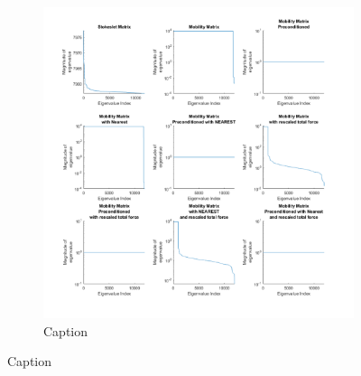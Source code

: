  \begin{figure}
     \centering
     \begin{subfigure}[b]{0.49\textwidth}
        \captionsetup{width=0.49\textwidth}
        \includegraphics[height=0.49\textheight,keepaspectratio]{Images/Eigenplots/EigenPlots-1.pdf}
        \caption{Caption}
        \label{fig:Eigen1}
    \end{subfigure}
\end{figure}
